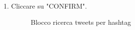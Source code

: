 \begin{enumerate}
	\item Cliccare su "CONFIRM".
	\begin{figure}[!ht]
		\centering
		\caption{Blocco ricerca tweets per hashtag}
	\end{figure}
\end{enumerate}

